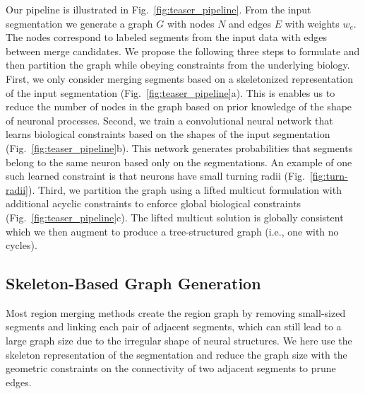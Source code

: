 Our pipeline is illustrated in Fig.~\ref{fig:teaser_pipeline}.
From the input segmentation we generate a graph $G$ with nodes $N$ and edges $E$ with weights $w_e$. 
The nodes correspond to labeled segments from the input data with edges between merge candidates.
We propose the following three steps to formulate and then partition the graph while obeying constraints from the underlying biology.
First, we only consider merging segments based on a skeletonized representation of the input segmentation (Fig.~\ref{fig:teaser_pipeline}a).
This is enables us to reduce the number of nodes in the graph based on prior knowledge of the shape of neuronal processes.
Second, we train a convolutional neural network that learns biological constraints based on the shapes of the input segmentation (Fig.~\ref{fig:teaser_pipeline}b).
This network generates probabilities that segments belong to the same neuron based only on the segmentations. 
An example of one such learned constraint is that neurons have small turning radii (Fig.~\ref{fig:turn-radii}).
Third, we partition the graph using a lifted multicut formulation with additional acyclic constraints to enforce global biological constraints (Fig.~\ref{fig:teaser_pipeline}c).
The lifted multicut solution is globally consistent which we then augment to produce a tree-structured graph (i.e., one with no cycles).

\subsection{Skeleton-Based Graph Generation}
\label{sec:skeletonization}
Most region merging methods create the region graph by removing small-sized segments and linking each pair of adjacent segments, which can still lead to a large graph size due to the irregular shape of neural structures.
We here use the skeleton representation of the segmentation and reduce the graph size with the geometric constraints on the connectivity of two adjacent segments to prune edges.

